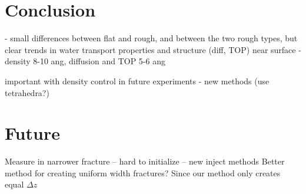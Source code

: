 \chapter{Conclusion}
- small differences between flat and rough, and between the two rough types, but clear trends in water transport properties and structure (diff, TOP) near surface
- density 8-10 ang, diffusion and TOP 5-6 ang

important with density control in future experiments - new methods (use tetrahedra?)

\chapter{Future}
Measure in narrower fracture -- hard to initialize -- new inject methods
Better method for creating uniform width fractures? Since our method only creates equal $\Delta z$